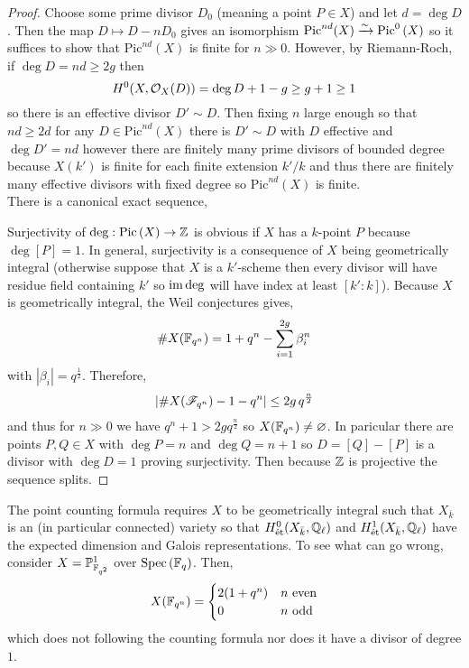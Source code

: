 \documentclass[12pt]{article}
\begin{document}
\begin{proof}
Choose some prime divisor $D_0$ (meaning a point $P \in X$) and let $d = \deg{D}$. Then the map $D \mapsto D - nD_0$ gives an isomorphism $\mathrm{Pic}^{nd}(X) \xrightarrow{\sim} \mathrm{Pic}^0\left( X \right)$ so it suffices to show that $\mathrm{Pic}^{nd}(X)$ is finite for $n \gg 0$. However, by Riemann-Roch, if $\deg{D} = nd \ge 2g$ then 
\[ H^0(X, \mathcal{O}_{X}(D)) = \deg{D} + 1 - g \ge g + 1 \ge 1 \]
so there is an effective divisor $D' \sim D$. Then fixing $n$ large enough so that $nd \ge 2d$ for any $D \in \mathrm{Pic}^{nd}(X)$ there is $D' \sim D$ with $D$ effective and $\deg{D'} = nd$ however there are finitely many prime divisors of bounded degree because $X(k')$ is finite for each finite extension $k'/k$ and thus there are finitely many effective divisors with fixed degree so $\mathrm{Pic}^{nd}(X)$ is finite.
\bigskip\\
There is a canonical exact sequence,
\begin{center}
\end{center}
Surjectivity of $\deg : \mathrm{Pic} \left( X \right) \to \mathbb{Z}$ is obvious if $X$ has a $k$-point $P$ because $\deg{[P]} = 1$. In general, surjectivity is a consequence of $X$ being geometrically integral (otherwise suppose that $X$ is a $k'$-scheme then every divisor will have residue field containing $k'$ so $\operatorname{\mathrm{im}}{\deg}$ will have index at least $[k' : k]$). Because $X$ is geometrically integral, the Weil conjectures gives,
\[ \# X(\mathbb{F}_{q^n}) = 1 + q^n - \sum_{i = 1}^{2g} \beta_i^n \]
with $|\beta_i| = q^{\frac{1}{2}}$. Therefore,
\[ | \# X(\mathscr{F}_{q^n}) - 1 - q^n | \le 2 g \, q^{\frac{n}{2}} \]
and thus for $n \gg 0$ we have $q^n +1 > 2g q^{\frac{n}{2}}$ so $X(\mathbb{F}_{q^n}) \neq \varnothing$. In paricular there are points $P, Q \in X$ with $\deg{P} = n$ and $\deg{Q} = n+1$ so $D = [Q] - [P]$ is a divisor with $\deg{D} = 1$ proving surjectivity. Then because $\mathbb{Z}$ is projective the sequence splits.
\end{proof}

\begin{rmk}
The point counting formula requires $X$ to be geometrically integral such that $X_{\bar{k}}$ is an (in particular connected) variety so that $H^0_{\text{\'{e}t}}(X_{\bar{k}}, \mathbb{Q}_\ell)$ and $H^1_{\text{\'{e}t}}(X_{\bar{k}}, \mathbb{Q}_\ell)$ have the expected dimension and Galois representations. To see what can go wrong, consider $X = \mathbb{P}^1_{\mathbb{F}_{q^2}}$ over $\mathrm{Spec}\left( \mathbb{F}_q \right)$. Then,
\[ X(\mathbb{F}_{q^n}) = 
\begin{cases}
2(1 + q^n) & n \text{ even}
\\
0 & n \text{ odd}
\end{cases} \]
which does not following the counting formula nor does it have a divisor of degree $1$.
\end{rmk}
\end{document}
